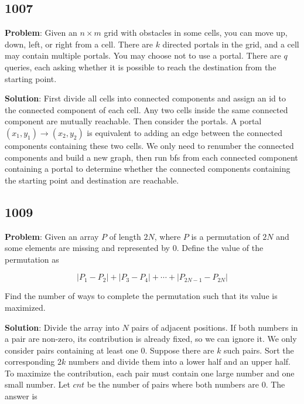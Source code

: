 \documentclass[
  a4paper,
  10pt]{article}
\begin{document}
\subsection*{1007}\label{section-3}

\textbf{Problem}: Given an \(n \times m\) grid with obstacles in some
cells, you can move up, down, left, or right from a cell. There are
\(k\) directed portals in the grid, and a cell may contain multiple
portals. You may choose not to use a portal. There are \(q\) queries,
each asking whether it is possible to reach the destination from the
starting point.

\textbf{Solution}: First divide all cells into connected components and
assign an id to the connected component of each cell. Any two cells
inside the same connected component are mutually reachable. Then
consider the portals. A portal \((x_1,y_1) \to (x_2,y_2)\) is equivalent
to adding an edge between the connected components containing these two
cells. We only need to renumber the connected components and build a new
graph, then run bfs from each connected component containing a portal to
determine whether the connected components containing the starting point
and destination are reachable.

\subsection*{1009}\label{section-4}

\textbf{Problem}: Given an array \(P\) of length \(2N\), where \(P\) is
a permutation of \(2N\) and some elements are missing and represented by
\(0\). Define the value of the permutation as

\[
|P_1-P_2|+|P_3-P_4|+\cdots+|P_{2N-1}-P_{2N}|
\]

Find the number of ways to complete the permutation such that its value
is maximized.

\textbf{Solution}: Divide the array into \(N\) pairs of adjacent
positions. If both numbers in a pair are non-zero, its contribution is
already fixed, so we can ignore it. We only consider pairs containing at
least one \(0\). Suppose there are \(k\) such pairs. Sort the
corresponding \(2k\) numbers and divide them into a lower half and an
upper half. To maximize the contribution, each pair must contain one
large number and one small number. Let \(cnt\) be the number of pairs
where both numbers are \(0\). The answer is
\end{document}
